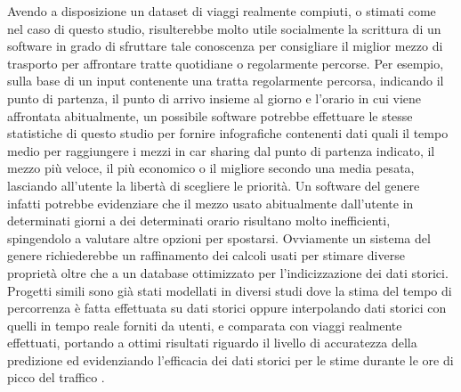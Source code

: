 Avendo a disposizione un dataset di viaggi realmente compiuti, o stimati come nel caso di questo studio, risulterebbe molto utile socialmente la scrittura di un software in grado di sfruttare tale conoscenza per consigliare il miglior mezzo di trasporto per affrontare tratte quotidiane o regolarmente percorse. Per esempio, sulla base di un input contenente una tratta regolarmente percorsa, indicando il punto di partenza, il punto di arrivo insieme al giorno e l'orario in cui viene affrontata abitualmente, un possibile software potrebbe effettuare le stesse statistiche di questo studio per fornire infografiche contenenti dati quali il tempo medio per raggiungere i mezzi in car sharing dal punto di partenza indicato, il mezzo più veloce, il più economico o il migliore secondo una media pesata, lasciando all'utente la libertà di scegliere le priorità. Un software del genere infatti potrebbe evidenziare che il mezzo usato abitualmente dall'utente in determinati giorni a dei determinati orario risultano molto inefficienti, spingendolo a valutare altre opzioni per spostarsi. Ovviamente un sistema del genere richiederebbe un raffinamento dei calcoli usati per stimare diverse proprietà oltre che a un database ottimizzato per l'indicizzazione dei dati storici. Progetti simili sono già stati modellati in diversi studi dove la stima del tempo di percorrenza è fatta effettuata su dati storici oppure interpolando dati storici con quelli in tempo reale forniti da utenti, e comparata con viaggi realmente effettuati, portando a ottimi risultati riguardo il livello di accuratezza della predizione ed evidenziando l'efficacia dei dati storici per le stime durante le ore di picco del traffico \cite{deeshma2015travel}\cite{chien2003dynamic}.
